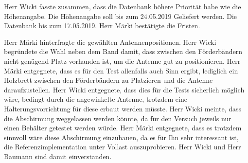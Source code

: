\documentclass[parskip=full, a4paper]{scrreprt}
\begin{document}
Herr Wicki fasste zusammen, dass die Datenbank höhere Priorität habe wie die Höhenangabe. Die Höhenangabe soll bis zum 24.05.2019 Geliefert werden. Die Datenbank bis zum 17.05.2019. Herr Märki bestätigte die Fristen.

Herr Märki hinterfragte die gewählten Antennenpositionen. Herr Wicki begründete die Wahl neben dem Band damit, dass zwischen den Förderbändern nicht genügend Platz vorhanden ist, um die Antenne gut zu positionieren. Herr Märki entgegnete, dass es für den Test allenfalls auch Sinn ergibt, lediglich ein Holzbrett zwischen den Förderbändern zu Platzieren und die Antenne daraufzustellen. Herr Wicki entgegnete, dass dies für die Tests sicherlich möglich wäre, bedingt durch die angewinkelte Antenne, trotzdem eine Halterungsvorrichtung für diese erbaut werden müsste. Herr Wicki meinte, dass die Abschirmung weggelassen werden könnte, da für den Versuch jeweils nur einen Behälter getestet werden würde. Herr Märki entgegnete, dass es trotzdem sinnvoll wäre diese Abschirmung einzubauen, da es für Ihn sehr interessant ist, die Referenzimplementation unter Vollast auszuprobieren. Herr Wicki und Herr Baumann sind damit einverstanden.
\end{document}
